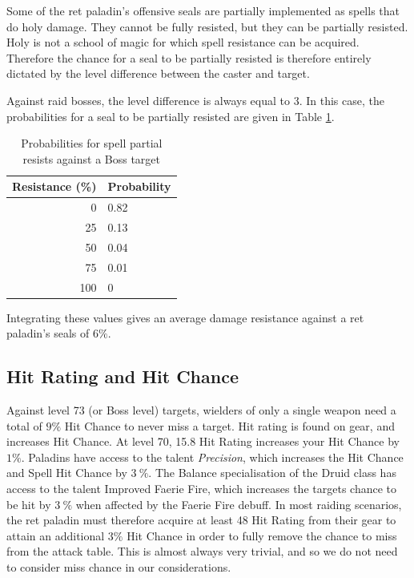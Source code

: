 \documentclass[letterpaper,11pt]{article}
\begin{document}
	Some of the ret paladin's offensive seals are partially implemented as spells that do holy damage.
	They cannot be fully resisted, but they can be partially resisted.
	Holy is not a school of magic for which spell resistance can be acquired.
	Therefore the chance for a seal to be partially resisted is therefore entirely dictated by the level difference between the caster and target.
	
	Against raid bosses, the level difference is always equal to 3.
	In this case, the probabilities for a seal to be partially resisted are given in Table \ref{tab:glancing}.
	\begin{table}[htb]
		\centering
			\begin{tabular}{r | l}
				Resistance (\%) & Probability \\
				\hline \hline
				0 & 0.82 \\
				25 & 0.13 \\
				50 & 0.04 \\
				75 & 0.01 \\
				100 & 0 \\
				\hline
			\end{tabular}
	    	\caption{Probabilities for spell partial resists against a Boss target}		
			\label{tab:glancing}
	\end{table}
	Integrating these values gives an average damage resistance against a ret paladin's seals of $6\%$.

	\subsection{Hit Rating and Hit Chance}
	Against level 73 (or Boss level) targets, wielders of only a single weapon need a total of $9\%$ Hit Chance to never miss a target.
	Hit rating is found on gear, and increases Hit Chance.
	At level 70, 15.8 Hit Rating increases your Hit Chance by $1\%$. 
	Paladins have access to the talent \emph{Precision}, which increases the Hit Chance and Spell Hit Chance by $3~\%$.
	The Balance specialisation of the Druid class has access to the talent Improved Faerie Fire, which increases the targets chance to be hit by $3~\%$ when affected by the Faerie Fire debuff.
	In most raiding scenarios, the ret paladin must therefore acquire at least 48 Hit Rating from their gear to attain an additional $3\%$ Hit Chance in order to fully remove the chance to miss from the attack table.
	This is almost always very trivial, and so we do not need to consider miss chance in our considerations.
		
\end{document}
